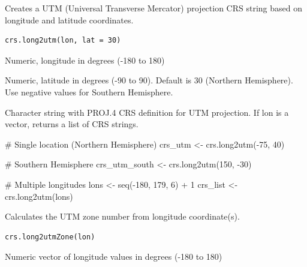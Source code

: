 \documentclass[a4paper]{book}
\begin{document}
%
\begin{Description}\relax
Creates a UTM (Universal Transverse Mercator) projection CRS string based
on longitude and latitude coordinates.
\end{Description}
%
\begin{Usage}
\begin{verbatim}
crs.long2utm(lon, lat = 30)
\end{verbatim}
\end{Usage}
%
\begin{Arguments}
\begin{ldescription}
\item[\code{lon}] Numeric, longitude in degrees (-180 to 180)

\item[\code{lat}] Numeric, latitude in degrees (-90 to 90). Default is 30 (Northern
Hemisphere). Use negative values for Southern Hemisphere.
\end{ldescription}
\end{Arguments}
%
\begin{Value}
Character string with PROJ.4 CRS definition for UTM projection.
If lon is a vector, returns a list of CRS strings.
\end{Value}
%
\begin{Examples}
\begin{ExampleCode}
# Single location (Northern Hemisphere)
crs_utm <- crs.long2utm(-75, 40)

# Southern Hemisphere
crs_utm_south <- crs.long2utm(150, -30)

# Multiple longitudes
lons <- seq(-180, 179, 6) + 1
crs_list <- crs.long2utm(lons)
\end{ExampleCode}
\end{Examples}
%
\begin{Description}\relax
Calculates the UTM zone number from longitude coordinate(s).
\end{Description}
%
\begin{Usage}
\begin{verbatim}
crs.long2utmZone(lon)
\end{verbatim}
\end{Usage}
%
\begin{Arguments}
\begin{ldescription}
\item[\code{lon}] Numeric vector of longitude values in degrees (-180 to 180)
\end{ldescription}
\end{Arguments}
\end{document}
